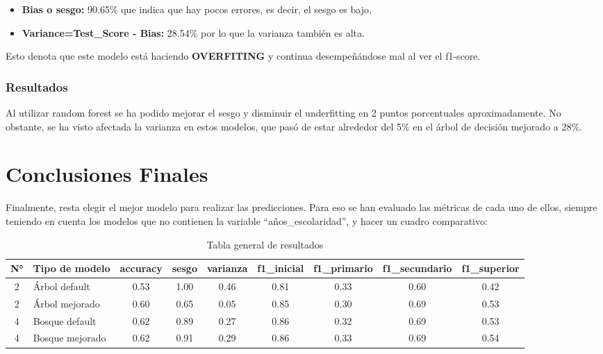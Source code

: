 \documentclass[a4paper]{article}
\begin{document}
            \begin{itemize}
                \item \textbf{Bias o sesgo:} 90.65\% que indica que hay pocos errores, es decir, el sesgo es bajo,
                \item \textbf{Variance=Test\_Score - Bias:} 28.54\% por lo que la varianza también es alta. 
            \end{itemize} 

            Esto denota que este modelo está haciendo \textbf{OVERFITING} y continua desempeñándose mal al ver el f1-score.
            
            \subsubsection*{Resultados}
            
             Al utilizar random forest  se ha podido mejorar el sesgo y disminuir el underfitting en 2 puntos porcentuales aproximadamente. No obstante, se ha visto afectada la varianza en estos modelos, que pasó de estar alrededor del 5\% en el árbol de decisión mejorado a 28\%.

\newpage

\section{Conclusiones Finales}

    Finalmente, resta elegir el mejor modelo para realizar las predicciones. Para eso se han evaluado las métricas de cada uno de ellos, siempre teniendo en cuenta los modelos que no contienen la variable ``años\_escolaridad'', y hacer un cuadro comparativo:
    
    \begin{table}[H]
        \centering
        \begin{tabular}{ clccccccc }
            \toprule
           N° & Tipo de modelo & accuracy & sesgo & varianza & f1\_inicial & f1\_primario & f1\_secundario & f1\_superior \\ \midrule
           2  & Árbol default & 0.53 & 1.00 & 0.46 & 0.81 & 0.33 & 0.60 & 0.42 \\ 
           2  &  Árbol mejorado & 0.60 & 0.65 & 0.05 & 0.85 & 0.30 & 0.69 & 0.53 \\
           4  & Bosque default & 0.62 & 0.89 & 0.27 & 0.86 & 0.32 & 0.69 & 0.53 \\ 
           4  & Bosque mejorado & 0.62 & 0.91 & 0.29 & 0.86 & 0.33 & 0.69 & 0.54 \\
           \bottomrule
        \end{tabular}
        \caption{Tabla general de resultados}
        \label{Result table}
    \end{table}
\end{document}
